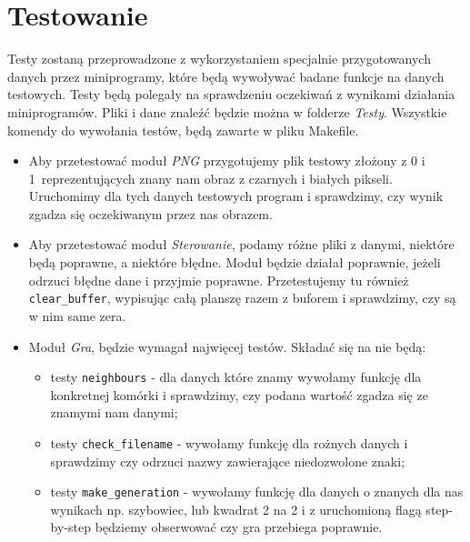 \documentclass[12pt]{report}
\newcommand{\code}[1]{\texttt{#1}}
\begin{document}
\section{Testowanie}
Testy zostaną przeprowadzone z wykorzystaniem specjalnie przygotowanych danych przez miniprogramy, które będą wywoływać badane funkcje na danych testowych. Testy będą polegały na sprawdzeniu oczekiwań z wynikami działania miniprogramów. Pliki i dane znaleźć będzie można w folderze \textit{Testy}. Wszystkie komendy do wywołania testów, będą zawarte w pliku Makefile.
\begin{itemize}
    \item Aby przetestować moduł \textit{PNG} przygotujemy plik testowy złożony z 0 i 1~reprezentujących znany nam obraz z czarnych i białych pikseli. Uruchomimy dla tych danych testowych program i sprawdzimy, czy wynik zgadza się oczekiwanym przez nas obrazem.
    \item Aby przetestować moduł \textit{Sterowanie}, podamy różne pliki z danymi, niektóre będą poprawne, a niektóre błędne. Moduł będzie działał poprawnie, jeżeli odrzuci błędne dane i przyjmie poprawne. Przetestujemy tu również \code{clear\_buffer}, wypisując całą planszę razem z buforem i sprawdzimy, czy są w nim same zera.
    \item Moduł \textit{Gra}, będzie wymagał najwięcej testów. Składać się na nie będą:
    \begin{itemize}
        \item testy \code{neighbours} - dla danych które znamy wywołamy funkcję dla konkretnej komórki i sprawdzimy, czy podana wartość zgadza się ze znamymi nam danymi;
        \item testy \code{check\_filename} - wywołamy funkcję dla rożnych danych i sprawdzimy czy odrzuci nazwy zawierające niedozwolone znaki;
        \item testy \code{make\_generation} - wywołamy funkcję dla danych o znanych dla nas wynikach np. szybowiec, lub kwadrat 2 na 2 i z uruchomioną flagą step-by-step będziemy obserwować czy gra przebiega poprawnie.
    \end{itemize}
\end{itemize}
\end{document}
